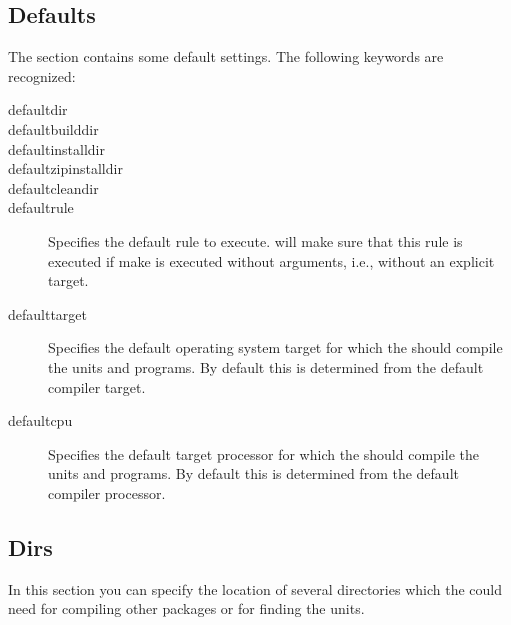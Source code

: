 \subsection{Defaults}
The  section contains some default settings. The following keywords
are recognized:
\begin{description}
\item[defaultdir]
\item[defaultbuilddir]
\item[defaultinstalldir]
\item[defaultzipinstalldir]
\item[defaultcleandir]
\item[defaultrule] Specifies the default rule to execute. 
will make sure that this rule is executed if make is executed without
arguments, i.e., without an explicit target.
\item[defaulttarget]
Specifies the default operating system target for which the 
should compile the units and programs. By default this is determined from
the default compiler target.
\item[defaultcpu]
Specifies the default target processor for which the 
should compile the units and programs. By default this is determined from
the default compiler processor.
\end{description}

\subsection{Dirs}
In this section you can specify the location of several directories
which the  could need for compiling other packages or for finding
the units.

